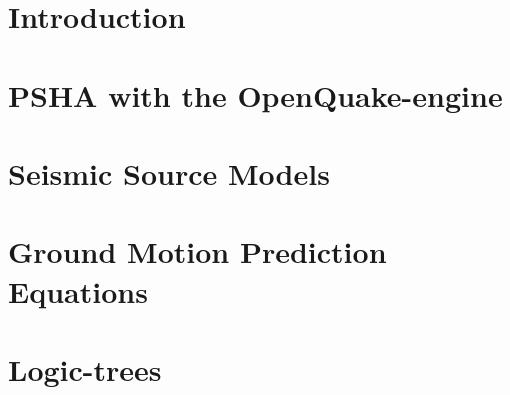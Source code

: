 \documentclass[11pt,fleqn]{book} %
\begin{document}
\chapter{Introduction}


\chapter{PSHA with the OpenQuake-engine}


\chapter{Seismic Source Models}
\label{chap:ssm}


\chapter{Ground Motion Prediction Equations}
\label{chap:gmpes}


\chapter{Logic-trees}


\end{document}
